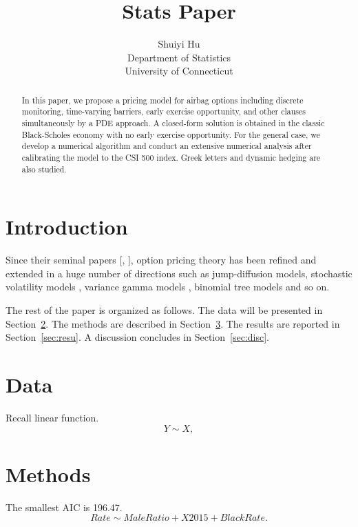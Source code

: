 \documentclass[12pt]{article}
\title{Stats Paper}
\author{Shuiyi Hu\\
  Department of Statistics\\
  University of Connecticut
}
\begin{document}
\maketitle

\begin{abstract}
  In this paper, we propose a pricing model for airbag options 
including discrete monitoring, time-varying barriers, early 
exercise opportunity, and other clauses simultaneously by a 
PDE approach. A closed-form solution is obtained in the classic 
Black-Scholes economy with no early exercise opportunity. For 
the general case, we develop a numerical algorithm and conduct an 
extensive numerical analysis after calibrating the model to 
the CSI 500 index. Greek letters and dynamic hedging are also 
studied.

\end{abstract}


\section{Introduction}
\label{sec:intro}

  Since their seminal papers [\citet{black1973pricing}, \citet{merton1973theory}], option 
pricing theory has been refined and extended in a huge number of 
directions such as jump-diffusion models, stochastic volatility 
models , variance gamma models \citep[e.g.,][]{madan1998variance}, binomial tree models 
and so on.



The rest of the paper is organized as follows.
The data will be presented in Section~\ref{sec:data}.
The methods are described in Section~\ref{sec:meth}.
The results are reported in Section~\ref{sec:resu}.
A discussion concludes in Section~\ref{sec:disc}.


\section{Data}
\label{sec:data}

  Recall linear function.
\begin{equation}
  \label{eq:lm}
  Y \sim X,
\end{equation}

\section{Methods}
\label{sec:meth}

The smallest AIC is 196.47.
\begin{equation}
  \label{eq:slm}
  Rate \sim MaleRatio + X2015 + BlackRate.
\end{equation}
\end{document}
